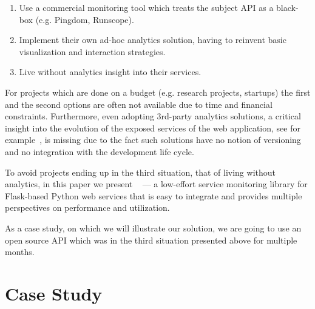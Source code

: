 \documentclass[conference]{IEEEtran}
\begin{document}
  \begin{enumerate}

    \item Use a commercial monitoring tool which treats the subject API as a black-box (e.g. Pingdom, Runscope). 

    \item Implement their own ad-hoc analytics solution, having to reinvent basic visualization and interaction strategies. 

    \item Live without analytics insight into their services.

  \end{enumerate}


For projects which are done on a budget (e.g. research projects, startups) the first and the second options are often not available due to time and financial constraints. Furthermore, even adopting 3rd-party analytics solutions, a critical insight into the evolution of the exposed services of the web application, see for example~\cite{papazoglou2011managing}, is missing due to the fact such solutions have no notion of versioning and no integration with the development life cycle.

To avoid projects ending up in the third situation, that of living without analytics, in this paper we present \tool~ --- a low-effort service monitoring library for Flask-based Python web services that is easy to integrate and provides multiple perspectives on performance and utilization.

As a case study, on which we will illustrate our solution, we are going to use an open source API which was in the third situation presented above for multiple months.



\section{Case Study}
\end{document}
